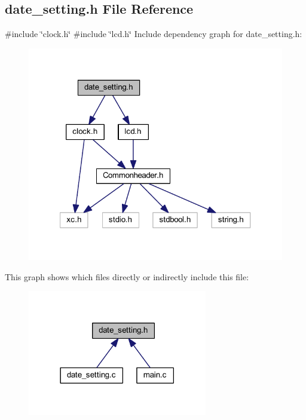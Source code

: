 \subsection{date\+\_\+setting.\+h File Reference}
\label{a00029}
{\ttfamily \#include \char`\"{}clock.\+h\char`\"{}}\newline
{\ttfamily \#include \char`\"{}lcd.\+h\char`\"{}}\newline
Include dependency graph for date\+\_\+setting.\+h\+:
\nopagebreak
\begin{figure}[H]
\begin{center}
\leavevmode
\includegraphics[width=321pt]{a00030}
\end{center}
\end{figure}
This graph shows which files directly or indirectly include this file\+:
\nopagebreak
\begin{figure}[H]
\begin{center}
\leavevmode
\includegraphics[width=222pt]{a00031}
\end{center}
\end{figure}
